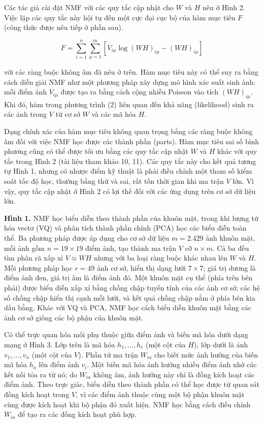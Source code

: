 Các tác giả cài đặt NMF với các quy tắc cập nhật cho \(W\) và \(H\) nêu ở Hình 2. Việc lặp các quy tắc này hội tụ đến một cực đại cục bộ của hàm mục tiêu \(F\) (công thức được nêu tiếp ở phần sau).

\begin{equation*}F=\sum_{i=1}^{n}\sum_{\mu=1}^{m}\left[V_{i\mu}\log (WH)_{i\mu}-(WH)_{i\mu}\right] \tag{2}\end{equation*}

với các ràng buộc không âm đã nêu ở trên. Hàm mục tiêu này có thể suy ra bằng cách diễn giải NMF như một phương pháp xây dựng mô hình xác suất sinh ảnh: mỗi điểm ảnh \(V_{i\mu}\) được tạo ra bằng cách cộng nhiễu Poisson vào tích \((WH)_{i\mu}\). Khi đó, hàm trong phương trình (2) liên quan đến khả năng (likelihood) sinh ra các ảnh trong \(V\) từ cơ sở \(W\) và các mã hóa \(H\).

Dạng chính xác của hàm mục tiêu không quan trọng bằng các ràng buộc không âm đối với việc NMF học được các thành phần (parts). Hàm mục tiêu sai số bình phương cũng có thể được tối ưu bằng các quy tắc cập nhật \(W\) và \(H\) khác với quy tắc trong Hình 2 (tài liệu tham khảo 10, 11). Các quy tắc này cho kết quả tương tự Hình 1, nhưng có nhược điểm kỹ thuật là phải điều chỉnh một tham số kiểm soát tốc độ học, thường bằng thử và sai, rất tốn thời gian khi ma trận \(V\) lớn. Vì vậy, quy tắc cập nhật ở Hình 2 có lợi thế đối với các ứng dụng trên cơ sở dữ liệu lớn.

\textbf{Hình 1.} NMF học biểu diễn theo thành phần của khuôn mặt, trong khi lượng tử hóa vectơ (VQ) và phân tích thành phần chính (PCA) học các biểu diễn toàn thể. Ba phương pháp được áp dụng cho cơ sở dữ liệu \(m = 2.429\) ảnh khuôn mặt, mỗi ảnh gồm \(n = 19 \times 19\) điểm ảnh, tạo thành ma trận \(V\) cỡ \(n \times m\). Cả ba đều tìm phân rã xấp xỉ \(V \approx WH\) nhưng với ba loại ràng buộc khác nhau lên \(W\) và \(H\). Mỗi phương pháp học \(r = 49\) ảnh cơ sở, hiển thị dạng lưới \(7 \times 7\); giá trị dương là điểm ảnh đen, giá trị âm là điểm ảnh đỏ. Một khuôn mặt cụ thể (phía trên bên phải) được biểu diễn xấp xỉ bằng chồng chập tuyến tính của các ảnh cơ sở; các hệ số chồng chập hiển thị cạnh mỗi lưới, và kết quả chồng chập nằm ở phía bên kia dấu bằng. Khác với VQ và PCA, NMF học cách biểu diễn khuôn mặt bằng các ảnh cơ sở giống các bộ phận của khuôn mặt.

Có thể trực quan hóa mối phụ thuộc giữa điểm ảnh và biến mã hóa dưới dạng mạng ở Hình 3. Lớp trên là mã hóa \(h_1,\dots,h_r\) (một cột của \(H\)), lớp dưới là ảnh \(v_1,\dots,v_n\) (một cột của \(V\)). Phần tử ma trận \(W_{ia}\) cho biết mức ảnh hưởng của biến mã hóa \(h_a\) lên điểm ảnh \(v_i\). Một biến mã hóa ảnh hưởng nhiều điểm ảnh nhờ các kết nối tỏa ra từ nó; do \(W_{ia}\) không âm, ảnh hưởng này chỉ là đồng kích hoạt các điểm ảnh. Theo trực giác, biểu diễn theo thành phần có thể học được từ quan sát đồng kích hoạt trong \(V\), vì các điểm ảnh thuộc cùng một bộ phận khuôn mặt cùng được kích hoạt khi bộ phận đó xuất hiện. NMF học bằng cách điều chỉnh \(W_{ia}\) để tạo ra các đồng kích hoạt phù hợp.

